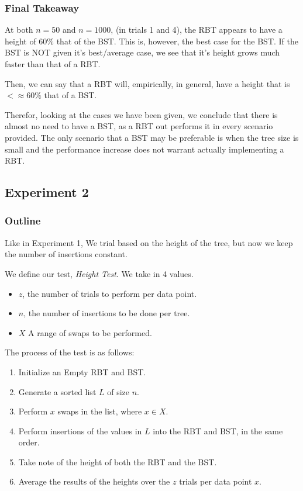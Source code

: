 \documentclass{article}
\begin{document}
\subsubsection{Final Takeaway}

At both $n=50$ and $n=1000$, (in trials 1 and 4), the RBT appears to have a height of $60\%$ that of the BST. This is, however, the best case for the BST. If the BST is NOT given it's best/average case, we see that it's height grows much faster than that of a RBT.

Then, we can say that a RBT will, empirically, in general, have a height that is $< \approx 60\%$ that of a BST.

Therefor, looking at the cases we have been given, we conclude that there is almost no need to have a BST, as a RBT out performs it in every scenario provided. The only scenario that a BST may be preferable is when the tree size is small and the performance increase does not warrant actually implementing a RBT.

\newpage
\subsection{Experiment 2}

\subsubsection{Outline}

Like in Experiment 1, We trial based on the height of the tree, but now we keep the number of insertions constant.

We define our test, \textit{Height Test}. We take in 4 values.
\begin{itemize}
    \item $z$, the number of trials to perform per data point.
    \item $n$, the number of insertions to be done per tree.
    \item $X$ A range of swaps to be performed.
\end{itemize}

The process of the test is as follows:

\begin{enumerate}
    \item Initialize an Empty RBT and BST.
    \item Generate a sorted list $L$ of size $n$.
    \item Perform $x$ swaps in the list, where $x \in X$.
    \item Perform insertions of the values in $L$ into the RBT and BST, in the same order.
    \item Take note of the height of both the RBT and the BST.
    \item Average the results of the heights over the $z$ trials per data point $x$.
\end{enumerate}
\end{document}
